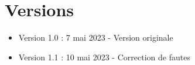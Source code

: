 \documentclass{article}
\begin{document}
	\newpage
	\section{Versions}
		\begin{itemize}
			\item Version 1.0 : 7 mai 2023 - Version originale
			\item Version 1.1 : 10 mai 2023 - Correction de fautes
		\end{itemize}
\end{document}
